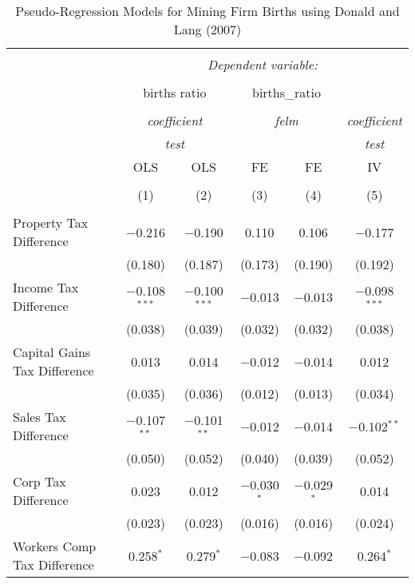 
\begin{table}[!htbp] \centering 
  \caption{Pseudo-Regression Models for  Mining Firm Births using Donald and Lang (2007)} 
  \label{} 
\begin{tabular}{@{\extracolsep{5pt}}lccccc} 
\\[-1.8ex]\hline 
\hline \\[-1.8ex] 
 & \multicolumn{5}{c}{\textit{Dependent variable:}} \\ 
\cline{2-6} 
\\[-1.8ex] & \multicolumn{2}{c}{births ratio} & \multicolumn{2}{c}{births\_ratio} &   \\ 
\\[-1.8ex] & \multicolumn{2}{c}{\textit{coefficient}} & \multicolumn{2}{c}{\textit{felm}} & \textit{coefficient} \\ 
 & \multicolumn{2}{c}{\textit{test}} & \multicolumn{2}{c}{\textit{}} & \textit{test} \\ 
 & OLS & OLS & FE & FE & IV \\ 
\\[-1.8ex] & (1) & (2) & (3) & (4) & (5)\\ 
\hline \\[-1.8ex] 
 Property Tax Difference & $-$0.216 & $-$0.190 & 0.110 & 0.106 & $-$0.177 \\ 
  & (0.180) & (0.187) & (0.173) & (0.190) & (0.192) \\ 
  Income Tax Difference & $-$0.108$^{***}$ & $-$0.100$^{***}$ & $-$0.013 & $-$0.013 & $-$0.098$^{***}$ \\ 
  & (0.038) & (0.039) & (0.032) & (0.032) & (0.038) \\ 
  Capital Gains Tax Difference & 0.013 & 0.014 & $-$0.012 & $-$0.014 & 0.012 \\ 
  & (0.035) & (0.036) & (0.012) & (0.013) & (0.034) \\ 
  Sales Tax Difference & $-$0.107$^{**}$ & $-$0.101$^{**}$ & $-$0.012 & $-$0.014 & $-$0.102$^{**}$ \\ 
  & (0.050) & (0.052) & (0.040) & (0.039) & (0.052) \\ 
  Corp Tax Difference & 0.023 & 0.012 & $-$0.030$^{*}$ & $-$0.029$^{*}$ & 0.014 \\ 
  & (0.023) & (0.023) & (0.016) & (0.016) & (0.024) \\ 
  Workers Comp Tax Difference & 0.258$^{*}$ & 0.279$^{*}$ & $-$0.083 & $-$0.092 & 0.264$^{*}$ \\ 

\end{tabular}
\end{table}
